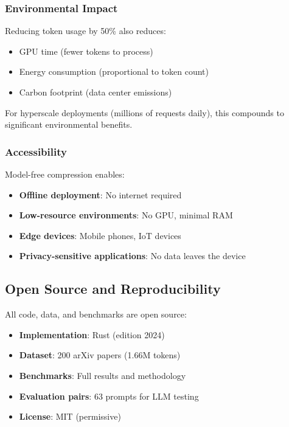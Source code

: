 \subsubsection{Environmental Impact}

Reducing token usage by 50\% also reduces:
\begin{itemize}
    \item GPU time (fewer tokens to process)
    \item Energy consumption (proportional to token count)
    \item Carbon footprint (data center emissions)
\end{itemize}

For hyperscale deployments (millions of requests daily), this compounds to significant environmental benefits.

\subsubsection{Accessibility}

Model-free compression enables:
\begin{itemize}
    \item \textbf{Offline deployment}: No internet required
    \item \textbf{Low-resource environments}: No GPU, minimal RAM
    \item \textbf{Edge devices}: Mobile phones, IoT devices
    \item \textbf{Privacy-sensitive applications}: No data leaves the device
\end{itemize}

\subsection{Open Source and Reproducibility}

All code, data, and benchmarks are open source:

\begin{itemize}
    \item \textbf{Implementation}: Rust (edition 2024)
    \item \textbf{Dataset}: 200 arXiv papers (1.66M tokens)
    \item \textbf{Benchmarks}: Full results and methodology
    \item \textbf{Evaluation pairs}: 63 prompts for LLM testing
    \item \textbf{License}: MIT (permissive)
\end{itemize}

